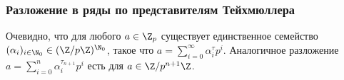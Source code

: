 \documentclass[
	extrafontsizes,
	11pt,
	hyphens,
]{memoir}
\begin{document}
\subsubsection{Разложение в ряды по представителям Тейхмюллера}


\begin{observation}
Очевидно, что
для любого \(a \in \Z_p\) существует единственное семейство \((\alpha_i)_{i \in \N_0} \in (\Z/p\Z)^{\N_0}\), такое что
\(a = \sum_{i = 0}^\infty \alpha_i^\tau p^i\).
Аналогичное разложение \(a = \sum_{i = 0}^n \alpha_i^{\tau_{n+1}} p^i\) есть для \(a \in \Z/p^{n+1}\Z\).
\end{observation}


\end{document}

